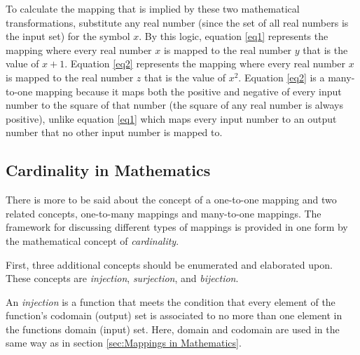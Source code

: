To calculate the mapping that is implied by these two mathematical transformations, substitute any real number (since the set of all real numbers is the input set) for the symbol \begin{math}x\end{math}. By this logic, equation \ref{eq1} represents the mapping where every real number \begin{math}x\end{math} is mapped to the real number \begin{math}y\end{math} that is the value of \begin{math}x + 1\end{math}. Equation \ref{eq2} represents the mapping where every real number \begin{math}x\end{math} is mapped to the real number \begin{math}z\end{math} that is the value of \begin{math}x^{2}\end{math}. Equation \ref{eq2} is a many-to-one mapping because it maps both the positive and negative of every input number to the square of that number (the square of any real number is always positive), unlike equation \ref{eq1} which maps every input number to an output number that no other input number is mapped to.

\subsection{Cardinality in Mathematics}

There is more to be said about the concept of a one-to-one mapping and two related concepts, one-to-many mappings and many-to-one mappings. The framework for discussing different types of mappings is provided in one form by the mathematical concept of \emph{cardinality}.

First, three additional concepts should be enumerated and elaborated upon. These concepts are \emph{injection}, \emph{surjection}, and \emph{bijection}.

An \emph{injection} is a function that meets the condition that every element of the function's codomain (output) set is associated to no more than one element in the functions domain (input) set. Here, domain and codomain are used in the same way as in section \ref{sec:Mappings in Mathematics}.

